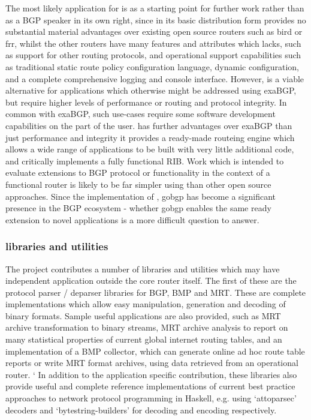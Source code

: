 The most likely application for \hbgp is as a starting point for further work rather than as a BGP speaker in its own right, since in its basic distribution form \hbgp provides no substantial  material advantages over existing open source routers such as bird or frr, whilst the other routers have many features and attributes which \hbgp lacks, such as support for other routing protocols, and operational support capabilities such as traditional static route policy configuration language, dynamic configuration, and a complete comprehensive logging and console interface.
However, \hbgp is a viable alternative for applications which otherwise might be addressed using exaBGP, but require higher levels of performance or routing and protocol integrity.
In common with exaBGP, such use-cases require some software development capabilities on the part of the user.
\hbgp has further  advantages over exaBGP than just performance and integrity \- it provides a ready-made routeing engine which allows a wide range of applications to be built with very little additional code, and critically \hbgp implements a fully functional RIB.
Work which is intended to evaluate extensions to BGP protocol or functionality in the context of a functional router is likely to be far simpler using \hbgp than other open source approaches.
Since the implementation of \hbgp, gobgp has become a significant presence in the BGP ecosystem - whether gobgp enables the same ready extension to novel applications is a more difficult question to answer.

\subsubsection*{\hbgp libraries and utilities}

The \hbgp project contributes a number of libraries and utilities which may have independent application outside the core router itself.  The first of these are the protocol parser / deparser libraries for BGP, BMP and MRT.  These are complete implementations which allow easy manipulation, generation and decoding of binary formats.  Sample useful applications are also provided, such as MRT archive transformation to binary streams,  MRT archive analysis to report on many statistical properties of current global internet routing tables, and an implementation of a BMP collector, which can generate online ad hoc route table reports or write MRT format archives, using data retrieved from an operational router.  `
In addition to the application specific contribution, these libraries also provide useful and complete reference implementations of current best practice approaches to network protocol programming in Haskell, e.g. using ‘attoparsec’ decoders and ‘bytestring-builders’ for decoding and encoding respectively.


